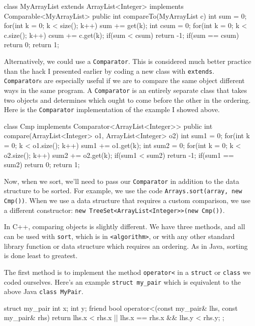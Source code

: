 \begin{mylstlisting}
class MyArrayList extends ArrayList<Integer> implements Comparable<MyArrayList> {
	public int compareTo(MyArrayList c) {
		int sum = 0;
		for(int k = 0; k < size(); k++) {
			sum += get(k);
		}
		int csum = 0;
		for(int k = 0; k < c.size(); k++) {
			csum += c.get(k);
		}
		if(sum < csum) return -1;
		if(sum == csum) return 0;
		return 1;
	}
}
\end{mylstlisting}

Alternatively, we could use a \texttt{Comparator}. This is considered much better practice than the hack I presented earlier by coding a new class with \texttt{extends}. \texttt{Comparator}s are especially useful if we are to compare the same object different ways in the same program. A \texttt{Comparator} is an entirely separate class that takes two objects and determines which ought to come before the other in the ordering. Here is the \texttt{Comparator} implementation of the example I showed above.

\begin{mylstlisting}
class Cmp implements Comparator<ArrayList<Integer>> {
	public int compare(ArrayList<Integer> o1, ArrayList<Integer> o2) {
		int sum1 = 0;
		for(int k = 0; k < o1.size(); k++) {
			sum1 += o1.get(k);
		}
		int sum2 = 0;
		for(int k = 0; k < o2.size(); k++) {
			sum2 += o2.get(k);
		}
		if(sum1 < sum2) return -1;
		if(sum1 == sum2) return 0;
		return 1;
	}
}
\end{mylstlisting}

Now, when we sort, we'll need to pass our \texttt{Comparator} in addition to the data structure to be sorted. For example, we use the code \texttt{Arrays.sort(array, new Cmp())}. When we use a data structure that requires a custom comparison, we use a different constructor: \texttt{new TreeSet<ArrayList<Integer>>(new Cmp())}.

In C++, comparing objects is slightly different. We have three methods, and all can be used with \texttt{sort}, which is in \texttt{<algorithm>}, or with any other standard library function or data structure which requires an ordering. As in Java, sorting is done least to greatest.

The first method is to implement the method \texttt{operator<} in a \texttt{struct} or \texttt{class} we coded ourselves. Here's an example \texttt{struct my\_pair} which is equivalent to the above Java \texttt{class MyPair}.

\begin{mylstlisting}[language=C++]
struct my_pair {
	int x;
	int y;
	friend bool operator<(const my_pair& lhs, const my_pair& rhs) {
		return lhs.x < rhs.x || lhs.x == rhs.x && lhs.y < rhs.y;
    }
};
\end{mylstlisting}

